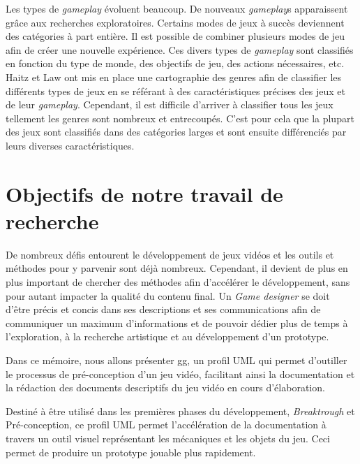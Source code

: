 Les types de \emph{gameplay} évoluent beaucoup. De nouveaux \emph{gameplay}s apparaissent grâce aux recherches exploratoires. Certains modes de jeux à succès deviennent des catégories à part entière. Il est possible de combiner plusieurs modes de jeu afin de créer une nouvelle expérience. Ces divers types de \emph{gameplay} sont classifiés en fonction du type de monde, des objectifs de jeu, des actions nécessaires, etc. Haitz et Law \cite{HeintzStephanie2015TGGM} ont mis en place une cartographie des genres afin de classifier les différents types de jeux en se référant à des caractéristiques précises des jeux et de leur \emph{gameplay}. Cependant, il est difficile d'arriver à classifier tous les jeux tellement les genres sont nombreux et entrecoupés. C'est pour cela que la plupart des jeux sont classifiés dans des catégories larges et sont ensuite différenciés par leurs diverses caractéristiques.



\section{Objectifs de notre travail de recherche}


De nombreux défis entourent le développement de jeux vidéos et les outils et méthodes pour y parvenir sont déjà nombreux. Cependant, il devient de plus en plus important de chercher des méthodes afin d'accélérer le développement, sans pour autant impacter la qualité du contenu final. Un \emph{Game designer} se doit d'être précis et concis dans ses descriptions et ses communications afin de communiquer un maximum d'informations et de pouvoir dédier plus de temps à l'exploration, à la recherche artistique et au développement d'un prototype. 



Dans ce mémoire, nous allons présenter \gls{gg}, un profil UML \cite{ReferenceBibliographique} qui permet d'outiller le processus de pré-conception d'un jeu vidéo, facilitant ainsi la documentation et la rédaction des documents descriptifs du jeu vidéo en cours d'élaboration.

Destiné à être utilisé dans les premières phases du développement, \emph{Breaktrough} et Pré-conception, ce profil UML permet l'accélération de la documentation à travers un outil visuel représentant les mécaniques et les objets du jeu. Ceci permet de produire un prototype jouable plus rapidement.

